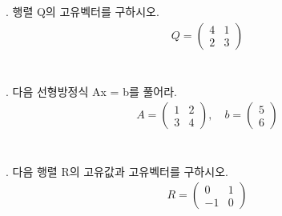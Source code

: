 \documentclass[fleqn]{article}
\begin{document}
. 행렬 Q의 고유벡터를 구하시오.
\begin{align*}
Q = \begin{pmatrix}
4 & 1 \\
2 & 3
\end{pmatrix}
\end{align*}
\\\\

. 다음 선형방정식 Ax = b를 풀어라.
\begin{align*}
A = \begin{pmatrix}
1 & 2 \\
3 & 4
\end{pmatrix}, \quad b = \begin{pmatrix}
5 \\
6
\end{pmatrix}
\end{align*}
\\\\

. 다음 행렬 R의 고유값과 고유벡터를 구하시오.
\begin{align*}
R = \begin{pmatrix}
0 & 1 \\
-1 & 0
\end{pmatrix}
\end{align*}
\\\\
\end{document}

